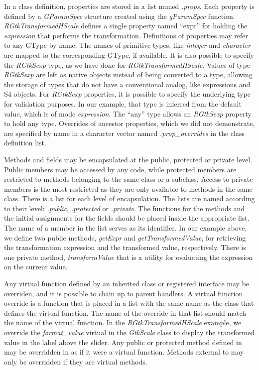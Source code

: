 \documentclass[article]{jss}
\begin{document}
In a class definition, properties are stored in a list named \emph{.props}.
Each property is defined by a \emph{GParamSpec} structure created using the 
\emph{gParamSpec} function. \emph{RGtkTransformedHScale} defines a single 
property named ``expr'' for holding the  \emph{expression} that 
performs the transformation. Definitions of properties may refer to any GType by name. 
The names of primitive  types, like \emph{integer} and \emph{character} 
are mapped to the corresponding GType, if available. It is also possible to specify the 
\emph{RGtkSexp} type, as we have done for \emph{RGtkTransformedHScale}.
Values of type \emph{RGtkSexp} are left as native  objects instead
of being converted to a  type, allowing the storage of 
 types that do not have a conventional  analog, like 
expressions and S4 objects. For \emph{RGtkSexp} properties, it is possible to 
specify the underlying  type for validation purposes. In our example, 
that type is inferred from the default value, which is of mode \emph{expression}.
The ``any'' type allows an \emph{RGtkSexp} property to hold any  type.
Overrides of ancestor properties, which we did not demonstrate,
are specified by name in a character vector named \emph{.prop\_overrides} in
the class definition list.

Methods and fields may be encapsulated at the public, protected or private level.
Public members may be accessed by any code,
while protected members are restricted to methods belonging to the same class or
a subclass. Access to private members is the most restricted as they are only 
available to methods in the same class. There is a 
list for each level of encapsulation. The lists are named
according to their level: \emph{.public}, \emph{.protected} or \emph{.private}. 
The functions for the methods and the initial assignments for the fields should
be placed inside the appropriate list. The name of a member in the list 
serves as its identifier. In our example above, we define two public methods,
\emph{getExpr} and \emph{getTransformedValue}, for retrieving the 
transformation expression and the transformed value, respectively. There is
one private method, \emph{transformValue} that is a utility for evaluating
the expression on the current value.

Any virtual function defined by an inherited class or registered interface may be 
overriden, and it is possible to chain up to parent handlers. 
A virtual function override is a function that is 
placed in a list with the same name as the class that defines the virtual 
function. The name of the override in that list should match the name of the virtual 
function. In the \emph{RGtkTransformedHScale} example, we override the 
\emph{format\_value} virtual in the \emph{GtkScale} class to display the
transformed value in the label above the slider. Any public or 
protected method defined in  may be overridden in 
 as if it were a virtual function. Methods external to 
may only be overridden if they are virtual methods.
\end{document}
